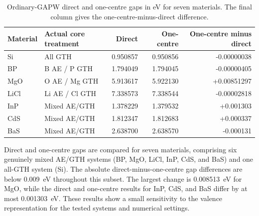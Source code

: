 \documentclass[10pt,a4paper]{article}
\begin{document}
\begin{table}[htbp]
\centering
\caption{Ordinary-GAPW direct and one-centre gaps in eV for seven materials. The final column gives the one-centre-minus-direct difference.}\label{tab:bandgap-controls}
\begin{tabular}{llrrr}
\toprule
Material & Actual core treatment & Direct & One-centre & One-centre minus direct \\
\midrule
Si & All GTH & 0.950857 & 0.950856 & -0.00000038 \\
BP & B AE / P GTH & 1.794049 & 1.794045 & -0.00000405 \\
MgO & O AE / Mg GTH & 5.913617 & 5.922130 & +0.00851297 \\
LiCl & Li AE / Cl GTH & 7.338573 & 7.338544 & -0.00002818 \\
InP & Mixed AE/GTH & 1.378229 & 1.379532 & +0.001303 \\

CdS & Mixed AE/GTH & 1.812347 & 1.812683 & +0.000337 \\

BaS & Mixed AE/GTH & 2.638700 & 2.638570 & -0.000131 \\

\bottomrule
\end{tabular}
\end{table}
\FloatBarrier


Direct and one-centre gaps are compared for seven materials, comprising six genuinely mixed AE/GTH systems (BP, MgO, LiCl, InP, CdS, and BaS) and one all-GTH system (Si). The absolute direct-minus-one-centre gap differences are below 0.009~eV throughout this subset. The largest change is 0.008513~eV for MgO, while the direct and one-centre results for InP, CdS, and BaS differ by at most 0.001303~eV. These results show a small sensitivity to the valence representation for the tested systems and numerical settings.

\FloatBarrier



\end{document}
